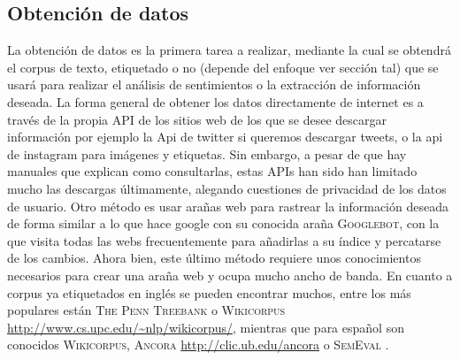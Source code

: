 \subsection{Obtención de datos}
La obtención de datos es la primera tarea a realizar, mediante la cual se obtendrá el corpus de texto, etiquetado o no (depende del enfoque ver sección tal) que se usará para realizar el análisis de sentimientos o la extracción de información deseada. \newline
La forma general de obtener los datos directamente de internet es a través de la propia API de los sitios web de los que se desee descargar información por ejemplo la Api de twitter si queremos descargar tweets, o la api de instagram para imágenes y etiquetas. Sin embargo, a pesar de que hay manuales que explican como consultarlas, estas APIs han sido han limitado mucho las descargas últimamente, alegando cuestiones de privacidad de los datos de usuario. Otro método es usar arañas web para rastrear la información deseada de forma similar a lo que hace google con su conocida araña \textsc{Googlebot}, con la que visita todas las webs frecuentemente para añadirlas a su índice y percatarse de los cambios. Ahora bien, este último método requiere unos conocimientos necesarios para crear una araña web y ocupa mucho ancho de banda. \newline
En cuanto a corpus ya etiquetados en inglés se pueden encontrar muchos, entre los más populares están \textsc{The Penn Treebank} \citet{marcus1993building} o \textsc{Wikicorpus} \url{http://www.cs.upc.edu/~nlp/wikicorpus/}, mientras que para español son conocidos \textsc{Wikicorpus}, \textsc{Ancora} \url{http://clic.ub.edu/ancora} o \textsc{SemEval} \citet{marquez2007semeval}. 
    




 